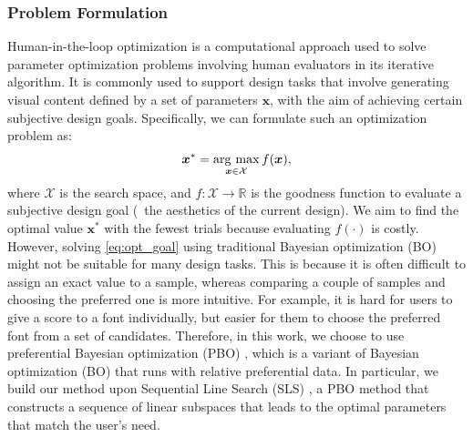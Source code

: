 \subsubsection{Problem Formulation}
Human-in-the-loop optimization is a computational approach used to solve parameter optimization problems involving human evaluators in its iterative algorithm.
It is commonly used to support design tasks that involve generating visual content defined by a set of parameters $\bm{x}$, with the aim of achieving certain subjective design goals.
Specifically, we can formulate such an optimization problem as:
\begin{align}
\bm{x}^* = \mathop{\rm arg~max}\limits_{\bm{x}\in{\mathcal{X}}}f(\bm{x}),
\label{eq:opt_goal}
\end{align}
where $\mathcal{X}$ is the search space, and $f: \mathcal{X} \rightarrow \mathbb{R}$ is the goodness function to evaluate a subjective design goal (\eg~the aesthetics of the current design).
We aim to find the optimal value $\bm{x}^*$ with the fewest trials because evaluating $f(\cdot)$ is costly.
However, solving \autoref{eq:opt_goal} using traditional Bayesian optimization (BO) might not be suitable for many design tasks.
This is because it is often difficult to assign an exact value to a sample, whereas comparing a couple of samples and choosing the preferred one is more intuitive.
For example, it is hard for users to give a score to a font individually, but easier for them to choose the preferred font from a set of candidates.
Therefore, in this work, we choose to use preferential Bayesian optimization (PBO) \cite{Koyama2022}, which is a variant of Bayesian optimization (BO) that runs with relative preferential data.
In particular, we build our method upon Sequential Line Search (SLS) \cite{KoyamaSequential2017}, a PBO method that constructs a sequence of linear subspaces that leads to the optimal parameters that match the user's need.


